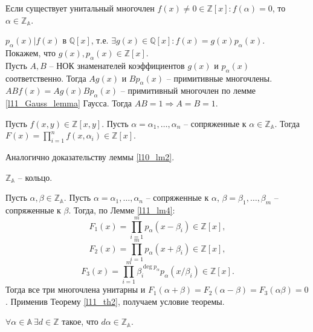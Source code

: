 \begin{theorem} \label{l11_th2}
	Если существует унитальный многочлен $f(x) \ne 0 \in \mathbb{Z}[x]: f(\alpha) = 0$, то $\alpha \in \mathbb{Z_{\mathbb{A}}}$.
\end{theorem}
\begin{pf}
	$p_{\alpha}(x) | f(x)$ в $\mathbb{Q}[x]$, т.е. $\exists g(x) \in \mathbb{Q}[x]: f(x) = g(x) p_{\alpha}(x)$.\\
	Покажем, что  $g(x), p_{\alpha}(x) \in \mathbb{Z}[x]$.\\
	Пусть $A, B$ -- НОК знаменателей коэффициентов $g(x)$ и $p_{\alpha}(x)$ соответственно. Тогда $Ag(x)$ и $Bp_{\alpha}(x)$ -- примитивные многочлены.\\
	$ABf(x) = Ag(x) Bp_{\alpha}(x)$ -- примитивный многочлен по лемме \ref{l11_Gauss_lemma} Гаусса. Тогда $AB = 1 \Rightarrow A = B = 1$.
\end{pf}

\begin{lemma} \label{l11_lm4}
	Пусть $f(x, y) \in \mathbb{Z}[x, y]$. Пусть $\alpha = \alpha_1, \ldots, \alpha_n$ -- сопряженные к $\alpha \in \mathbb{Z_{\mathbb{A}}}$. 
	Тогда $\displaystyle F(x) = \prod_{i = 1}^{n} f(x, \alpha_i) \in \mathbb{Z}[x]$.
\end{lemma}
\begin{pf}
	Аналогично доказательству леммы \ref{l10_lm2}.
\end{pf}

\begin{theorem} \label{l11_th3}
	$\mathbb{Z_{\mathbb{A}}}$ -- кольцо.
\end{theorem}
\begin{pf}
	Пусть $\alpha, \beta \in \mathbb{Z_{\mathbb{A}}}$. Пусть $\alpha = \alpha_1, \ldots, \alpha_n$  -- сопряженные к $\alpha$, $\beta = \beta_1, \ldots, \beta_m$ -- сопряженные к $\beta$.
	Тогда, по Лемме \ref{l11_lm4}:
	$$F_1(x) = \prod_{i = 1}^{m} p_{\alpha}(x - \beta_i) \in \mathbb{Z}[x],$$
	$$F_2(x) = \prod_{i = 1}^{m} p_{\alpha}(x + \beta_i) \in \mathbb{Z}[x],$$
	$$F_3(x) = \prod_{i = 1}^{m} \beta_i^{\deg p_{\alpha}} p_{\alpha}(x / \beta_i) \in \mathbb{Z}[x].$$
	Тогда все три многочлена унитарны и $F_1(\alpha + \beta) = F_2(\alpha - \beta) = F_3(\alpha \beta) = 0$. Применив Теорему \ref{l11_th2}, получаем условие теоремы.
\end{pf}

\begin{problem}
	$\forall \alpha \in \mathbb{A} \ \exists d \in \mathbb{Z}$ такое, что $d \alpha \in \mathbb{Z_{\mathbb{A}}}$.
\end{problem}~\\

